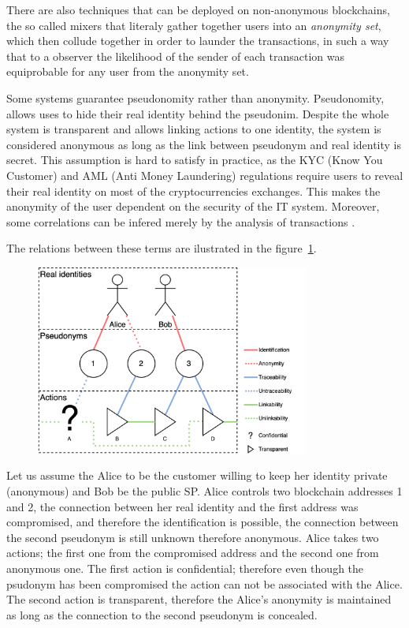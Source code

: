 \documentclass{ieeeaccess}
\begin{document}
There are also techniques that can be deployed on non-anonymous blockchains, the so called mixers that literaly gather together users into an \textit{anonymity set}, which then collude together in order to launder the transactions, in such a way that to a observer the likelihood of the sender of each transaction was equiprobable for any user from the anonymity set.

Some systems guarantee pseudonomity rather than anonymity. Pseudonomity, allows uses to hide their real identity behind the pseudonim. Despite the whole system is transparent and allows linking actions to one identity, the system is considered anonymous as long as the link between pseudonym and real identity is secret. This assumption is hard to satisfy in practice, as the KYC (Know You Customer) and AML (Anti Money Laundering) regulations require users to reveal their real identity on most of the cryptocurrencies exchanges. This makes the anonymity of the user dependent on the security of the IT system. Moreover, some correlations can be infered merely by the analysis of transactions \cite{androulaki2013evaluating, ober2013structure}.

The relations between these terms are ilustrated in the figure~\ref{fig:anonymity-diagram}.

\begin{figure}[h!]
\caption{}
\centering
\includegraphics[width=9cm]{anonymity-diagram.png}
\label{fig:anonymity-diagram}
\end{figure}

Let us assume the Alice to be the customer willing to keep her identity private (anonymous) and Bob be the public SP. Alice controls two blockchain addresses 1 and 2, the connection between her real identity and the first address was compromised, and therefore the identification is possible, the connection between the second pseudonym is still unknown therefore anonymous. Alice takes two actions; the first one from the compromised address and the second one from anonymous one. The first action is confidential; therefore even though the psudonym has been compromised the action can not be associated with the Alice. The second action is transparent, therefore the Alice's anonymity is maintained as long as the connection to the second pseudonym is concealed. 
\end{document}
